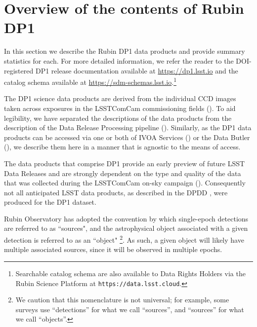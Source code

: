 \section{Overview of the contents of Rubin \gls{DP1}}
\label{sec:data_products}
In this section we describe the Rubin \gls{DP1} data products and provide summary statistics for each.
For more detailed information, we refer the reader to the DOI-registered \gls{DP1} release documentation available at \url{https://dp1.lsst.io} and the catalog schema available at \url{https://sdm-schemas.lsst.io}.\footnote{Searchable catalog schema are also available to Data Rights Holders via the Rubin Science Platform at \nolinkurl{https://data.lsst.cloud}.}

The \gls{DP1} science data products are derived from the \nvisitimages individual \gls{CCD} images taken across \nexposures exposures in the \nfields \gls{LSSTComCam} commissioning fields ().
To aid legibility, we have separated the descriptions of the data products from the description of the Data Release Processing pipeline ().
Similarly, as the \gls{DP1} data products can be accessed via one or both of \gls{IVOA} Services () or the Data \gls{Butler} (), we describe them here in a manner that is agnostic to the means of access.

The data products that comprise \gls{DP1} provide an early preview of future LSST Data Releases and are strongly dependent on the type and quality of the data that was collected during the \gls{LSSTComCam} on-sky campaign ().
Consequently not all anticipated  \gls{LSST} data products, as described in the \gls{DPDD} \citep[][]{LSE-163}, were produced for the \gls{DP1} dataset.

Rubin Observatory has adopted the convention by which single-epoch detections are referred to as ``sources", and the astrophysical object associated with a given detection is referred to as an ``object"
\footnote{We caution that this nomenclature is not universal; for example, some surveys use ``detections'' for what we call ``sources'', and ``sources'' for what we call ``objects''.}.
As such, a given object will likely have multiple associated  sources, since it will be observed in multiple epochs.


